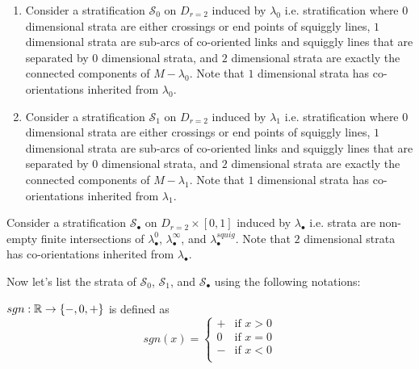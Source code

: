 \begin{definition}
\begin{enumerate}
\item Consider a stratification $\mathcal{S}_0$ on $D_{r=2}$ induced by $\lambda_0$ i.e. stratification where $0$ dimensional strata are either crossings or end points of squiggly lines, $1$ dimensional strata are sub-arcs of co-oriented links and squiggly lines that are separated by $0$ dimensional strata, and $2$ dimensional strata are exactly the connected components of $M-\lambda_0$. Note that $1$ dimensional strata has co-orientations inherited from $\lambda_0$.

\item Consider a stratification $\mathcal{S}_1$ on $D_{r=2}$ induced by $\lambda_1$ i.e. stratification where $0$ dimensional strata are either crossings or end points of squiggly lines, $1$ dimensional strata are sub-arcs of co-oriented links and squiggly lines that are separated by $0$ dimensional strata, and $2$ dimensional strata are exactly the connected components of $M-\lambda_1$. Note that $1$ dimensional strata has co-orientations inherited from $\lambda_1$.
\end{enumerate}

\item Consider a stratification $\mathcal{S}_\bullet$ on $D_{r=2}\times [0,1]$ induced by $\lambda_\bullet$ i.e. strata are non-empty finite intersections of $\lambda_\bullet^0$, $\lambda_\bullet^\infty$, and $\lambda_\bullet^{squig}$. Note that $2$ dimensional strata has co-orientations inherited from $\lambda_\bullet$.
\end{definition}

Now let's list the strata of $\mathcal{S}_0$, $\mathcal{S}_1$, and $\mathcal{S}_\bullet$ using the following notations:
\begin{definition}
$sgn : \mathbb{R} \rightarrow \{-,0,+ \}$ is defined as 
\[sgn(x)=\left\{
\begin{array}{ll}
    + & \text{if } x > 0 \\
    0 & \text{if } x = 0 \\
	- & \text{if } x < 0 \\
\end{array}
\right.
\]
\end{definition}

